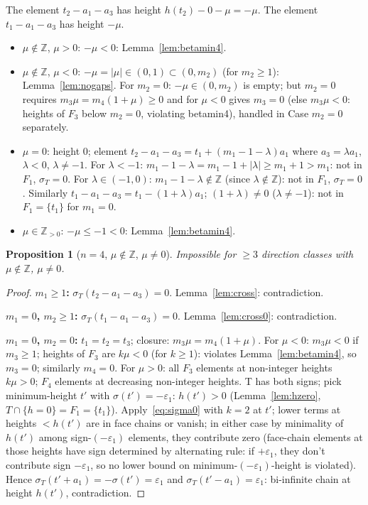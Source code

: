 \documentclass{article}
\newtheorem{prop}{Proposition}
\begin{document}
The element $t_2-a_1-a_3$ has height $h(t_2)-0-\mu=-\mu$.
The element $t_1-a_1-a_3$ has height $-\mu$.
\begin{itemize}
\item $\mu\notin\mathbb Z$, $\mu>0$: $-\mu<0$: Lemma~\ref{lem:betamin4}. \checkmark
\item $\mu\notin\mathbb Z$, $\mu<0$: $-\mu=|\mu|\in(0,1)\subset(0,m_2)$ (for $m_2\ge 1$): Lemma~\ref{lem:nogaps}. \checkmark
  For $m_2=0$: $-\mu\in(0,m_2)$ is empty; but $m_2=0$ requires $m_3\mu=m_4(1+\mu)\ge 0$ and for $\mu<0$ gives $m_3=0$ (else $m_3\mu<0$: heights of $F_3$ below $m_2=0$, violating betamin4), handled in Case $m_2=0$ separately.
\item $\mu=0$: height $0$; element $t_2-a_1-a_3=t_1+(m_1-1-\lambda)a_1$ where $a_3=\lambda a_1$, $\lambda<0$, $\lambda\ne-1$.
  For $\lambda<-1$: $m_1-1-\lambda=m_1-1+|\lambda|\ge m_1+1>m_1$: not in $F_1$, $\sigma_T=0$.
  For $\lambda\in(-1,0)$: $m_1-1-\lambda\notin\mathbb Z$ (since $\lambda\notin\mathbb Z$): not in $F_1$, $\sigma_T=0$.
  Similarly $t_1-a_1-a_3=t_1-(1+\lambda)a_1$; $(1+\lambda)\ne 0$ ($\lambda\ne -1$): not in $F_1=\{t_1\}$ for $m_1=0$.
  \checkmark
\item $\mu\in\mathbb Z_{>0}$: $-\mu\le-1<0$: Lemma~\ref{lem:betamin4}. \checkmark
\end{itemize}

\begin{prop}[$n=4$, $\mu\notin\mathbb Z$, $\mu\ne 0$]\label{prop:n4mu}
Impossible for $\ge 3$ direction classes with $\mu\notin\mathbb Z$, $\mu\ne 0$.
\end{prop}
\begin{proof}
\textbf{$m_1\ge 1$:} $\sigma_T(t_2-a_1-a_3)=0$. Lemma~\ref{lem:cross}: contradiction.

\textbf{$m_1=0$, $m_2\ge 1$:} $\sigma_T(t_1-a_1-a_3)=0$. Lemma~\ref{lem:cross0}: contradiction.

\textbf{$m_1=0$, $m_2=0$:} $t_1=t_2=t_3$; closure: $m_3\mu=m_4(1+\mu)$.
For $\mu<0$: $m_3\mu<0$ if $m_3\ge 1$; heights of $F_3$ are $k\mu<0$ (for $k\ge 1$):
violates Lemma~\ref{lem:betamin4}, so $m_3=0$; similarly $m_4=0$.
For $\mu>0$: all $F_3$ elements at non-integer heights $k\mu>0$; $F_4$ elements at decreasing non-integer heights. T has both signs; pick minimum-height $t'$ with $\sigma(t')=-\varepsilon_1$: $h(t')>0$ (Lemma~\ref{lem:hzero}, $T\cap\{h=0\}=F_1=\{t_1\}$). Apply~\eqref{eq:sigma0} with $k=2$ at $t'$; lower terms at heights $<h(t')$ are in face chains or vanish; in either case by minimality of $h(t')$ among sign-$(-\varepsilon_1)$ elements, they contribute zero (face-chain elements at those heights have sign determined by alternating rule: if $+\varepsilon_1$, they don't contribute sign $-\varepsilon_1$, so no lower bound on minimum-$(-\varepsilon_1)$-height is violated). Hence $\sigma_T(t'+a_1)=-\sigma(t')=\varepsilon_1$ and $\sigma_T(t'-a_1)=\varepsilon_1$: bi-infinite chain at height $h(t')$, contradiction.
\end{proof}
\end{document}
